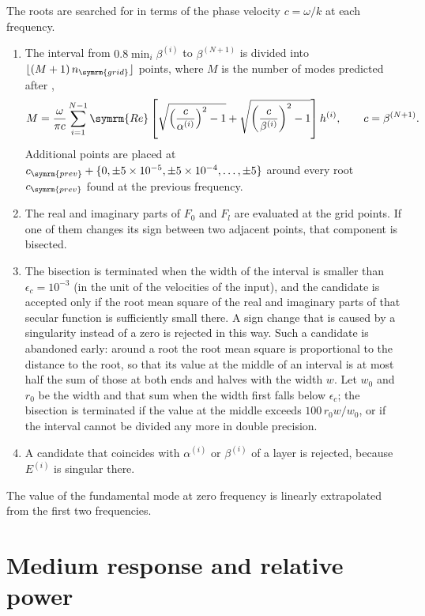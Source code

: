 \documentclass[a4paper, 10pt]{article}
\begin{document}
The roots are searched for in terms of the phase velocity $c = \omega / k$ at each frequency.
\begin{enumerate}
  \item The interval from $0.8 \min_i \beta^{(i)}$ to $\beta^{(N + 1)}$ is divided into $\lfloor (M + 1)\, n_{\symrm{grid}} \rfloor$ points, where $M$ is the number of modes predicted after \textcite{fan2007},
  \begin{align}
    M = \frac{\omega}{\pi c} \sum_{i = 1}^{N - 1}
    \symrm{Re} \left[
      \sqrt{ \left( \frac{c}{\alpha^{(i)}} \right)^2 - 1 }
      +
      \sqrt{ \left( \frac{c}{\beta^{(i)}} \right)^2 - 1 }
    \right] h^{(i)},
    \qquad c = \beta^{(N + 1)}.
  \end{align}
  Additional points are placed at $c_{\symrm{prev}} + \{0, \pm 5 \times 10^{-5}, \pm 5 \times 10^{-4}, \dots, \pm 5\}$ around every root $c_{\symrm{prev}}$ found at the previous frequency.
  \item The real and imaginary parts of $F_0$ and $F_l$ are evaluated at the grid points. If one of them changes its sign between two adjacent points, that component is bisected.
  \item The bisection is terminated when the width of the interval is smaller than $\epsilon_c = 10^{-3}$ (in the unit of the velocities of the input), and the candidate is accepted only if the root mean square of the real and imaginary parts of that secular function is sufficiently small there. A sign change that is caused by a singularity instead of a zero is rejected in this way. Such a candidate is abandoned early: around a root the root mean square is proportional to the distance to the root, so that its value at the middle of an interval is at most half the sum of those at both ends and halves with the width $w$. Let $w_0$ and $r_0$ be the width and that sum when the width first falls below $\epsilon_c$; the bisection is terminated if the value at the middle exceeds $100\, r_0 w / w_0$, or if the interval cannot be divided any more in double precision.
  \item A candidate that coincides with $\alpha^{(i)}$ or $\beta^{(i)}$ of a layer is rejected, because $E^{(i)}$ is singular there.
\end{enumerate}
The value of the fundamental mode at zero frequency is linearly extrapolated from the first two frequencies.

\section{Medium response and relative power}
\end{document}
